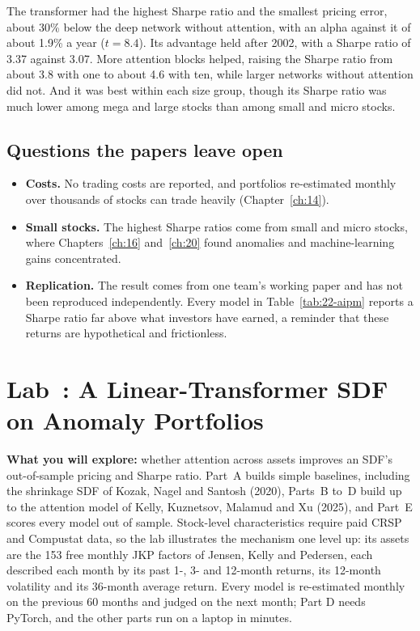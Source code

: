 The transformer had the highest Sharpe ratio and the smallest pricing error, about 30\% below the deep network without attention, with an alpha against it of about 1.9\% a year ($t = 8.4$). Its advantage held after 2002, with a Sharpe ratio of 3.37 against 3.07. More attention blocks helped, raising the Sharpe ratio from about 3.8 with one to about 4.6 with ten, while larger networks without attention did not. And it was best within each size group, though its Sharpe ratio was much lower among mega and large stocks than among small and micro stocks.

\subsection{Questions the papers leave open}

\begin{itemize}
  \item \textbf{Costs.} No trading costs are reported, and portfolios re-estimated monthly over thousands of stocks can trade heavily (Chapter~\ref{ch:14}).
  \item \textbf{Small stocks.} The highest Sharpe ratios come from small and micro stocks, where Chapters~\ref{ch:16} and~\ref{ch:20} found anomalies and machine-learning gains concentrated.
  \item \textbf{Replication.} The result comes from one team's working paper and has not been reproduced independently. Every model in Table~\ref{tab:22-aipm} reports a Sharpe ratio far above what investors have earned, a reminder that these returns are hypothetical and frictionless.
\end{itemize}

\section{Lab~\thechapter: A Linear-Transformer SDF on Anomaly Portfolios}
\label{sec:22-lab}

\textbf{What you will explore:} whether attention across assets improves an SDF's out-of-sample pricing and Sharpe ratio. Part~A builds simple baselines, including the shrinkage SDF of Kozak, Nagel and Santosh (2020), Parts~B to~D build up to the attention model of Kelly, Kuznetsov, Malamud and Xu (2025), and Part~E scores every model out of sample. Stock-level characteristics require paid CRSP and Compustat data, so the lab illustrates the mechanism one level up: its assets are the 153 free monthly JKP factors of Jensen, Kelly and Pedersen, each described each month by its past 1-, 3- and 12-month returns, its 12-month volatility and its 36-month average return. Every model is re-estimated monthly on the previous 60 months and judged on the next month; Part D needs PyTorch, and the other parts run on a laptop in minutes.

